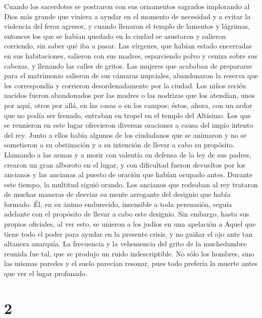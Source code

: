  Cuando los sacerdotes se postraron con sus ornamentos
sagrados implorando al Dios más grande que viniera a ayudar en el
momento de necesidad y a evitar la violencia del feroz agresor, y cuando
llenaron el templo de lamentos y lágrimas,  entonces los
que se habían quedado en la ciudad se asustaron y salieron corriendo,
sin saber qué iba a pasar.  Las vírgenes, que habían
estado encerradas en sus habitaciones, salieron con sus madres,
esparciendo polvo y ceniza sobre sus cabezas, y llenando las calles de
gritos.  Las mujeres que acababan de prepararse para el
matrimonio salieron de sus cámaras nupciales, abandonaron la reserva que
les correspondía y corrieron desordenadamente por la ciudad.
 Los niños recién nacidos fueron abandonados por las
madres o las nodrizas que los atendían, unos por aquí, otros por allá,
en las casas o en los campos; éstos, ahora, con un ardor que no podía
ser frenado, entraban en tropel en el templo del Altísimo.
 Los que se reunieron en este lugar ofrecieron diversas
oraciones a causa del impío intento del rey.  Junto a
ellos había algunos de los ciudadanos que se animaron y no se sometieron
a su obstinación y a su intención de llevar a cabo su propósito.
 Llamando a las armas y a morir con valentía en defensa
de la ley de sus padres, crearon un gran alboroto en el lugar, y con
dificultad fueron devueltos por los ancianos y las ancianas al puesto de
oración que habían ocupado antes.  Durante este tiempo,
la multitud siguió orando.  Los ancianos que rodeaban al
rey trataron de muchas maneras de desviar su mente arrogante del
designio que había formado.  Él, en su ánimo endurecido,
insensible a toda persuasión, seguía adelante con el propósito de llevar
a cabo este designio.  Sin embargo, hasta sus propios
oficiales, al ver esto, se unieron a los judíos en una apelación a Aquel
que tiene todo el poder para ayudar en la presente crisis, y no guiñar
el ojo ante tan altanera anarquía.  La frecuencia y la
vehemencia del grito de la muchedumbre reunida fue tal, que se produjo
un ruido indescriptible.  No sólo los hombres, sino las
mismas paredes y el suelo parecían resonar, pues todo prefería la muerte
antes que ver el lugar profanado.

\hypertarget{section-1}{%
\section{2}\label{section-1}}


